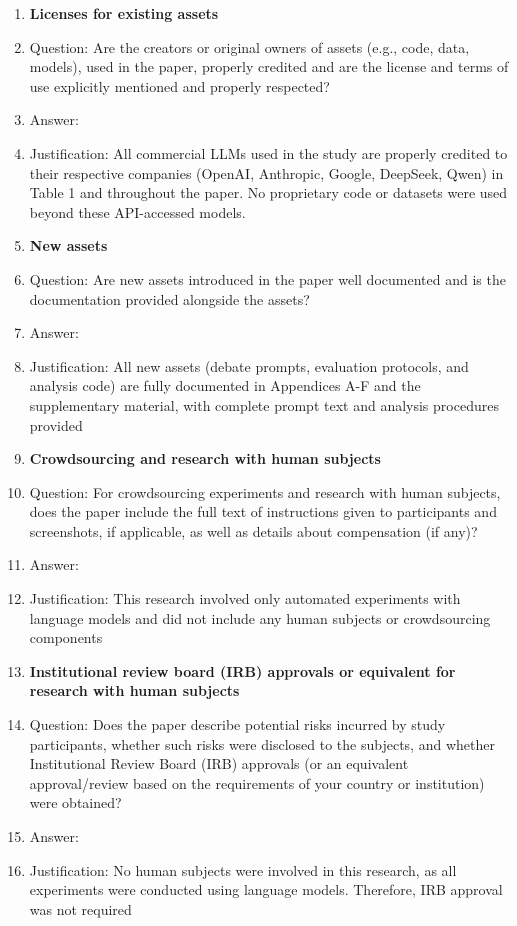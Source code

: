 \documentclass{article}
\begin{document}
\begin{enumerate}
\item {\bf Licenses for existing assets}
    \item[] Question: Are the creators or original owners of assets (e.g., code, data, models), used in the paper, properly credited and are the license and terms of use explicitly mentioned and properly respected?
    \item[] Answer: \answerYes{} %
    \item[] Justification: All commercial LLMs used in the study are properly credited to their respective companies (OpenAI, Anthropic, Google, DeepSeek, Qwen) in Table 1 and throughout the paper. No proprietary code or datasets were used beyond these API-accessed models.


\item {\bf New assets}
    \item[] Question: Are new assets introduced in the paper well documented and is the documentation provided alongside the assets?
    \item[] Answer: \answerYes{} %
    \item[] Justification: All new assets (debate prompts, evaluation protocols, and analysis code) are fully documented in Appendices A-F and the supplementary material, with complete prompt text and analysis procedures provided

\item {\bf Crowdsourcing and research with human subjects}
    \item[] Question: For crowdsourcing experiments and research with human subjects, does the paper include the full text of instructions given to participants and screenshots, if applicable, as well as details about compensation (if any)?
    \item[] Answer: \answerNA{} %
    \item[] Justification: This research involved only automated experiments with language models and did not include any human subjects or crowdsourcing components

\item {\bf Institutional review board (IRB) approvals or equivalent for research with human subjects}
    \item[] Question: Does the paper describe potential risks incurred by study participants, whether such risks were disclosed to the subjects, and whether Institutional Review Board (IRB) approvals (or an equivalent approval/review based on the requirements of your country or institution) were obtained?
    \item[] Answer: \answerNA{} %
    \item[] Justification: No human subjects were involved in this research, as all experiments were conducted using language models. Therefore, IRB approval was not required


\end{enumerate}
\end{document}
